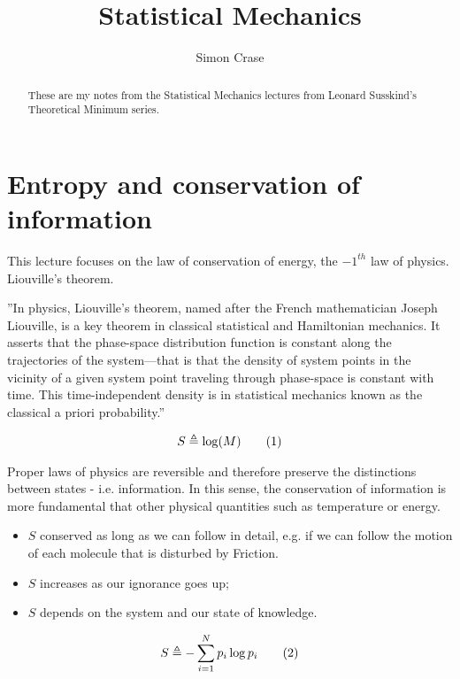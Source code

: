 \documentclass[]{article}
\title{Statistical Mechanics}
\author{Simon Crase}
\newcommand\numberthis{\addtocounter{equation}{1}\tag{\theequation}}
\begin{document}
\maketitle

\begin{abstract}
These are my notes from the Statistical Mechanics lectures from Leonard Susskind's Theoretical Minimum series.
\end{abstract}

\tableofcontents


\section{Entropy and conservation of information}
This lecture focuses on the law of conservation of energy, the $-1^{th}$ law of physics. Liouville's theorem.

''In physics, Liouville's theorem, named after the French mathematician Joseph Liouville, is a key theorem in classical statistical and Hamiltonian mechanics. It asserts that the phase-space distribution function is constant along the trajectories of the system—that is that the density of system points in the vicinity of a given system point traveling through phase-space is constant with time. This time-independent density is in statistical mechanics known as the classical a priori probability.''

\begin{align*}
S \triangleq \log(M) \numberthis \label{eq:entropy:simple}
\end{align*}

Proper laws of physics are reversible and therefore preserve the distinctions between states - i.e. information.  In this sense, the conservation of information is more fundamental that other physical quantities such as temperature or energy.  
\begin{itemize}
	\item $S$ conserved as long as we can follow in detail, e.g. if we can follow the motion of each molecule that is disturbed by Friction.
	\item $S$ increases as our ignorance goes up;
	\item $S$ depends on the system and our state of knowledge.
\end{itemize}

\begin{align*}
S \triangleq - \sum_{i=1}^{N} p_i \log{p_i} \numberthis \label{eq:entropy}
\end{align*}
\end{document}
